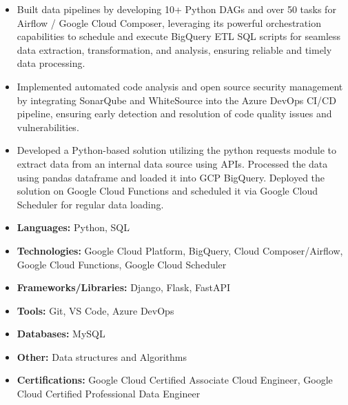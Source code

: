 \documentclass[10pt,a4paper,ragged2e]{altacv}
\begin{document}
\smallskip
{}
\begin{itemize}
\item Built data pipelines by developing 10+ Python DAGs and over 50 tasks for Airflow / Google Cloud Composer, leveraging its powerful orchestration capabilities to schedule and execute BigQuery ETL SQL scripts for seamless data extraction, transformation, and analysis, ensuring reliable and timely data processing.
\item Implemented automated code analysis and open source security management by integrating SonarQube and WhiteSource into the Azure DevOps CI/CD pipeline, ensuring early detection and resolution of code quality issues and vulnerabilities.
\item Developed a Python-based solution utilizing the python requests module to extract data from an internal data source using APIs. Processed the data using pandas dataframe and loaded it into GCP BigQuery. Deployed the solution on Google Cloud Functions and scheduled it via Google Cloud Scheduler for regular data loading.
\smallskip
\end{itemize}


\smallskip
\begin{itemize}
\item \textbf{Languages:} Python, SQL
\item \textbf{Technologies:} Google Cloud Platform, BigQuery, Cloud Composer/Airflow, Google Cloud Functions, Google Cloud Scheduler
\item \textbf{Frameworks/Libraries:} Django, Flask, FastAPI
\item \textbf{Tools:} Git, VS Code, Azure DevOps
\item \textbf{Databases:} MySQL
\item \textbf{Other:} Data structures and Algorithms
\item \textbf{Certifications:} Google Cloud Certified Associate Cloud Engineer, Google Cloud Certified Professional Data Engineer
\end{itemize}
\end{document}
